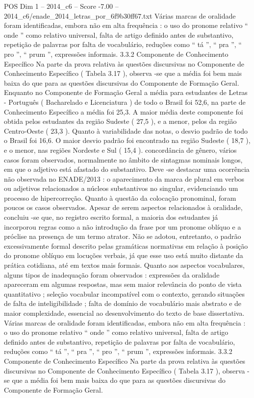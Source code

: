 \begin{textsample}{POS Dim 1 – 2014\_c6 – Score -7.00 – 2014\_c6/enade\_2014\_letras\_por\_6f9b30ff67.txt}
Várias marcas de oralidade foram identificadas, embora não em alta frequência : o uso do pronome relativo “ onde ” como relativo universal, falta de artigo definido antes de substantivo, repetição de palavras por falta de vocabulário, reduções como “ tá ”, “ pra ”, “ pro ”, “ prum ”, expressões informais. 3.3.2 Componente de Conhecimento Específico Na parte da prova relativa às questões discursivas no Componente de Conhecimento Específico ( Tabela 3.17 ), observa -se que a média foi bem mais baixa do que para as questões discursivas do Componente de Formação Geral.
Enquanto no Componente de Formação Geral a média para estudantes de Letras - Português ( Bacharelado e Licenciatura ) de todo o Brasil foi 52,6, na parte de Conhecimento Específico a média foi 25,3.
A maior média deste componente foi obtida pelos estudantes da região Sudeste ( 27,5 ), e a menor, pelos da região Centro-Oeste ( 23,3 ).
Quanto à variabilidade das notas, o desvio padrão de todo o Brasil foi 16,6.
O maior desvio padrão foi encontrado na região Sudeste ( 18,7 ), e o menor, nas regiões Nordeste e Sul ( 15,4 ). concordância de gênero, vários casos foram observados, normalmente no âmbito de sintagmas nominais longos, em que o adjetivo está afastado do substantivo.
Deve -se destacar uma ocorrência não observada no ENADE/2013 : o aparecimento da marca de plural em verbos ou adjetivos relacionados a núcleos substantivos no singular, evidenciando um processo de hipercorreção.
Quanto à questão da colocação pronominal, foram poucos os casos observados.
Apesar de serem aspectos relacionados à oralidade, concluiu -se que, no registro escrito formal, a maioria dos estudantes já incorporou regras como a não introdução da frase por um pronome oblíquo e a próclise na presença de um termo atrator.
Não se adotou, entretanto, o padrão excessivamente formal descrito pelas gramáticas normativas em relação à posição do pronome oblíquo em locuções verbais, já que esse uso está muito distante da prática cotidiana, até em textos mais formais.
Quanto aos aspectos vocabulares, alguns tipos de inadequação foram observados : expressões da oralidade apareceram em algumas respostas, mas sem maior relevância do ponto de vista quantitativo ; seleção vocabular incompatível com o contexto, gerando situações de falta de inteligibilidade ; falta de domínio de vocabulário mais abstrato e de maior complexidade, essencial ao desenvolvimento do texto de base dissertativa.
Várias marcas de oralidade foram identificadas, embora não em alta frequência : o uso do pronome relativo “ onde ” como relativo universal, falta de artigo definido antes de substantivo, repetição de palavras por falta de vocabulário, reduções como “ tá ”, “ pra ”, “ pro ”, “ prum ”, expressões informais. 3.3.2 Componente de Conhecimento Específico Na parte da prova relativa às questões discursivas no Componente de Conhecimento Específico ( Tabela 3.17 ), observa -se que a média foi bem mais baixa do que para as questões discursivas do Componente de Formação Geral.

\end{textsample}
